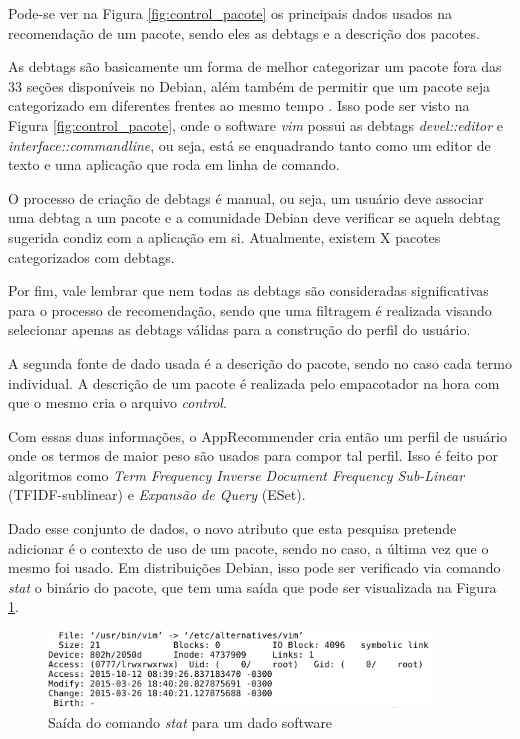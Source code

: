 Pode-se ver na Figura \ref{fig:control_pacote} os principais dados usados na
recomendação de um pacote, sendo eles as debtags e a descrição dos pacotes.

As debtags são basicamente um forma de melhor categorizar um pacote fora das 33
seções disponíveis no Debian, além também de permitir que um pacote seja
categorizado em diferentes frentes ao mesmo tempo \cite{zini2005cute}. Isso pode ser visto na Figura
\ref{fig:control_pacote}, onde o software \textit{vim} possui as debtags
\textit{devel::editor} e \textit{interface::commandline}, ou seja, está se
enquadrando tanto como um editor de texto e uma aplicação que roda em linha de
comando. 

O processo de criação de debtags é manual, ou seja, um usuário deve associar uma
debtag a um pacote e a comunidade Debian deve verificar se aquela debtag
sugerida condiz com a aplicação em si. Atualmente, existem X pacotes
categorizados com debtags.

Por fim, vale lembrar que nem todas as debtags são consideradas significativas
para o processo de recomendação, sendo que uma filtragem é realizada visando
selecionar apenas as debtags válidas para a construção do perfil do usuário.

A segunda fonte de dado usada é a descrição do pacote, sendo no caso cada termo
individual. A descrição de um pacote é realizada pelo empacotador na hora com
que o mesmo cria o arquivo \textit{control}.

Com essas duas informações, o AppRecommender cria então um perfil de usuário
onde os termos de maior peso são usados para compor tal perfil. Isso é feito por
algoritmos como \textit{Term Frequency Inverse Document Frequency Sub-Linear}
(TFIDF-sublinear) e \textit{Expansão de Query} (ESet).

Dado esse conjunto de dados, o novo atributo que esta pesquisa pretende
adicionar é o contexto de uso de um pacote, sendo no caso, a última vez que o
mesmo foi usado. Em distribuições Debian, isso pode ser verificado via comando
\textit{stat} o binário do pacote, que tem uma saída que pode ser visualizada na Figura
\ref{fig:comando_stat}.

\begin{figure}[h]
  \centering
  \includegraphics[width=0.9\textwidth]{figuras/comando_stat.eps}
  \caption{Saída do comando \textit{stat} para um dado software}
  \label{fig:comando_stat}
\end{figure}

